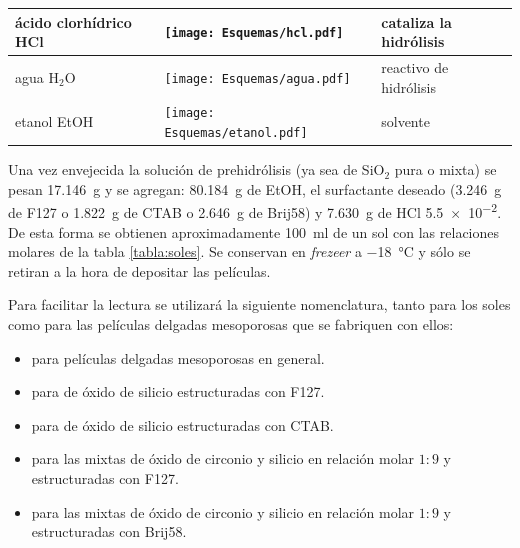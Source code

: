 \begin{table}[ht!]
\begin{tabular}{>{\raggedright\arraybackslash}m{2.40cm}>{\centering\arraybackslash}m{4cm}>{\centering\arraybackslash}m{2.35cm}>{\raggedright\arraybackslash}m{1.7cm}}
				  		  ácido\index{acido@ácido} clorhídrico HCl\index{acido@ácido!clohídrico}& \texttt{[image: Esquemas/hcl.pdf]}  & \multirow{1}{*}{$36,46$}   & cataliza la hidrólisis\index{hidrolisis@hidrólisis} \\ \midrule
				  		  agua \hspace{2cm} H$_2$O  &  \texttt{[image: Esquemas/agua.pdf]}  & \multirow{1}{*}{$18,02$}   & reactivo de hidrólisis\index{hidrolisis@hidrólisis} \\ \midrule
				  		  etanol\index{etanol} \hspace{2cm} EtOH\index{etanol}  & \texttt{[image: Esquemas/etanol.pdf]}  & \multirow{1}{*}{$46,07$}   & solvente \\ 
				  		  \bottomrule
				    	  \end{tabular}
				   		  \label{tabla:reactivos}
					      \end{table}
			\vspace*{-0.6cm}			      
			Una vez envejecida la solución de prehidrólisis (ya sea de SiO$_2$ pura o mixta) se pesan  \SI{17.146}{\gram} y se agregan: \SI{80.184}{\gram} de EtOH, el surfactante deseado (\SI{3.246}{\gram} de F127 o \SI{1.822}{\gram} de CTAB o \SI{2.646}{\gram} de Brij58\index{Brij58}) y \SI{7.630}{\gram} de HCl \SI{5,5e-2}{\Molar}. De esta forma se obtienen aproximadamente \SI{100}{\ml} de un sol con las relaciones molares de la tabla \ref{tabla:soles}. Se conservan en \textit{frezeer} a \SI{-18}{\celsius} y sólo se retiran a la hora de depositar las películas. 

			Para facilitar la lectura se utilizará la siguiente nomenclatura, tanto para los soles como para las películas delgadas mesoporosas que se fabriquen con ellos: 

				\begin{itemize}
			     \item \pdm\space para películas delgadas mesoporosas en general.
			     \item \pdmF\space para \pdm\space de óxido de silicio estructuradas con F127. 
			     \item \pdmC\space para \pdm\space de óxido de silicio estructuradas con CTAB.
			     \item \pdmZ\space para las \pdm\space mixtas de óxido de circonio y silicio en relación molar $1\!:\!9$ y estructuradas con F127.
			     \item \pdmZB\space para las \pdm\space mixtas de óxido de circonio y silicio en relación molar $1\!:\!9$ y estructuradas con Brij58\index{Brij58}. 
      		     \end{itemize}	
			
